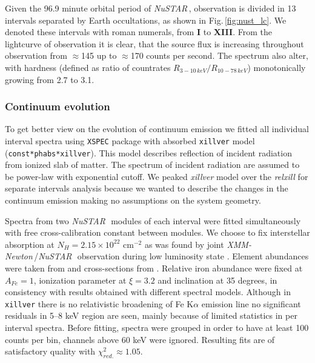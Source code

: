 \documentclass[a4paper,fleqn,usenatbib]{mnras}
\def\xmm{{\em XMM-Newton\,}}
\def\nustar{{\em NuSTAR\,}}
\begin{document}
Given the 96.9 minute orbital period of \nustar, observation is divided in 13 intervals separated by Earth occultations, as shown in Fig.\,\ref{fig:nust_lc}. 
We denoted these intervals with roman numerals, from {\bf I} to {\bf XIII}. 
From the lightcurve of observation it is clear, that the source flux is increasing throughout observation from $\approx$145 up to $\approx$170 counts per second. 
The spectrum also alter, with hardness (defined as ratio of countrates  $R_{3-10\,keV}/R_{10-78\,keV}$) monotonically growing from 2.7 to 3.1. 


\subsubsection{Continuum evolution}
To get better view on the evolution of continuum emission we fitted all individual interval spectra using \texttt{XSPEC} package \citep{arnaud96} with absorbed \texttt{xillver} \citep{garcia13} model (\texttt{const*phabs*xillver}). 
This model describes reflection of incident radiation from ionized slab of matter. 
The spectrum of incident radiation are assumed to be power-law with exponential cutoff. 
We peaked {\it xillver} model over the {\it relxill} for separate intervals analysis because we wanted to describe the changes in the continuum emission making no assumptions on the system geometry. 

Spectra from two \nustar\, modules of each interval were fitted simultaneously with free cross-calibration constant between modules.
We choose to fix interstellar absorption at $N_{H} = 2.15\times10^{22}$ cm$^{-2}$ as was found by joint \xmm/\nustar\, observation during low luminosity state \citep{fuerst16}. 
Element abundances were taken from \cite{wilms00} and cross-sections from \cite{verner96}. 
Relative iron abundance were fixed at  $A_{Fe} = 1$, ionization parameter at $\xi=3.2$ and inclination at 35 degrees, in consistency with \citet{miller15_nust} results obtained with different spectral models. 
Although in  \texttt{xillver} there is no relativistic broadening of Fe K$\alpha$ emission line no significant residuals in 5--8 keV region are seen, mainly because of limited statistics in per interval spectra. 
Before fitting, spectra were grouped in order to have at least 100 counts per bin, channels above 60 keV were ignored. 
Resulting fits are of satisfactory quality with $\chi^{2}_{red.} \approx 1.05$. 
 
\end{document}
